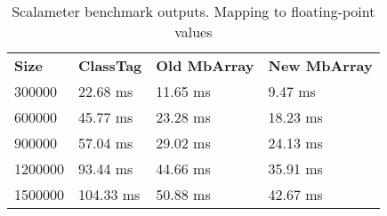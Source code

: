 \begin{table}[t]
  \begin{tabularx}{0.48\textwidth}{|g *{3}{|Y}|} \hline
    \textbf{Size} & \textbf{ClassTag} & \textbf{Old MbArray}& \textbf{New MbArray} \\
    300000		&              22.68 ms  &              11.65 ms &             9.47 ms \\
    600000		&              45.77 ms	 &              23.28 ms &             18.23 ms \\
    900000      &              57.04 ms  &              29.02 ms &             24.13 ms \\
    1200000     &              93.44 ms  &              44.66 ms &             35.91 ms \\ 
    1500000     &              104.33 ms &              50.88 ms &             42.67 ms \\ \hline
  \end{tabularx}
  \vspace{-2mm}
  \caption{Scalameter benchmark outputs. Mapping to floating-point values}
  \label{table:OtherCTvsMB}
  \vspace{-1em}
\end{table}